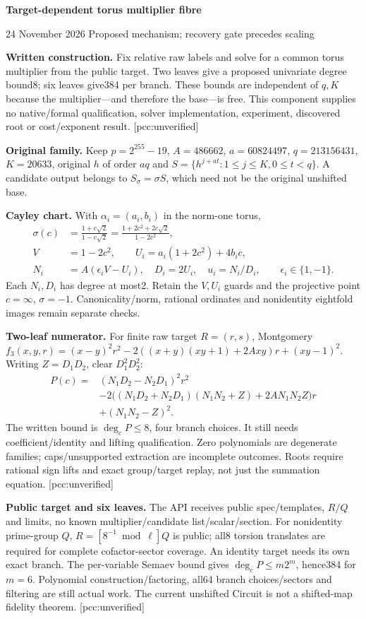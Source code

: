 \documentclass[10pt]{article}
\begin{document}
{\Large\bfseries\color{ink} Target-dependent torus multiplier fibre}\par
{\small 24 November 2026 \quad Proposed mechanism; recovery gate precedes scaling}

\textbf{Written construction.} Fix relative raw labels and solve for a common
torus multiplier from the public target. Two leaves give a proposed univariate
degree bound8; six leaves give384 per branch. These bounds are independent
of $q,K$ because the multiplier---and therefore the base---is free. This
component supplies no native/formal qualification, solver implementation,
experiment, discovered root or cost/exponent result. [pcc:unverified]

\textbf{Original family.} Keep $p=2^{255}-19$, $A=486662$, $a=60824497$,
$q=213156431$, $K=20633$, original $h$ of order $aq$ and
$S=\{h^{j+at}:1\le j\le K,0\le t<q\}$. A candidate output belongs to
$S_\sigma=\sigma S$, which need not be the original unshifted base.

\textbf{Cayley chart.} With $\alpha_i=(a_i,b_i)$ in the norm-one torus,
\begin{align*}
\sigma(c)&=\frac{1+c\sqrt2}{1-c\sqrt2}
 =\frac{1+2c^2+2c\sqrt2}{1-2c^2},\\
V&=1-2c^2,\qquad U_i=a_i(1+2c^2)+4b_ic,\\
N_i&=A(\epsilon_iV-U_i),\quad D_i=2U_i,\quad u_i=N_i/D_i,
\qquad \epsilon_i\in\{1,-1\}.
\end{align*}
Each $N_i,D_i$ has degree at most2. Retain the $V,U_i$ guards and the
projective point $c=\infty$, $\sigma=-1$. Canonicality/norm, rational
ordinates and nonidentity eightfold images remain separate checks.

\textbf{Two-leaf numerator.} For finite raw target $R=(r,s)$, Montgomery
$f_3(x,y,r)=(x-y)^2r^2-2((x+y)(xy+1)+2Axy)r+(xy-1)^2$.
Writing $Z=D_1D_2$, clear $D_1^2D_2^2$:
\begin{align*}
P(c)={}&(N_1D_2-N_2D_1)^2r^2\\
 &-2\big((N_1D_2+N_2D_1)(N_1N_2+Z)+2AN_1N_2Z\big)r\\
 &+(N_1N_2-Z)^2.
\end{align*}
The written bound is $\deg_cP\le8$, four branch choices. It still needs
coefficient/identity and lifting qualification. Zero polynomials are
degenerate families; caps/unsupported extraction are incomplete outcomes.
Roots require rational sign lifts and exact group/target replay, not just
the summation equation. [pcc:unverified]

\textbf{Public target and six leaves.} The API receives public spec/templates,
$R/Q$ and limits, no known multiplier/candidate list/scalar/section. For
nonidentity prime-group $Q$, $R=[8^{-1}\bmod\ell]Q$ is public; all8 torsion
translates are required for complete cofactor-sector coverage. An identity
target needs its own exact branch. The per-variable Semaev bound gives
$\deg_cP\le m2^m$, hence384 for $m=6$. Polynomial construction/factoring,
all64 branch choices/sectors and filtering are still actual work. The current
unshifted Circuit is not a shifted-map fidelity theorem. [pcc:unverified]
\end{document}
